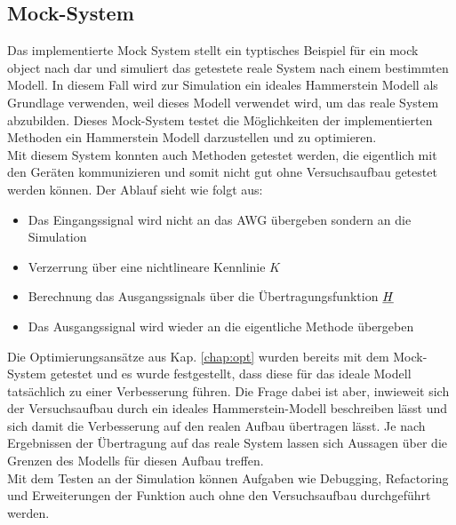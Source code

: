 \documentclass[../Report.tex]{subfiles}
\begin{document}
\subsection{Mock-System}
\label{subsec:code.mock}
Das implementierte Mock System stellt ein typtisches Beispiel für ein mock object nach \cite{mock} dar und simuliert das getestete reale System nach einem bestimmten Modell. In diesem Fall wird zur Simulation ein ideales Hammerstein Modell als Grundlage verwenden, weil dieses Modell verwendet wird, um das reale System abzubilden. Dieses Mock-System testet die Möglichkeiten der implementierten Methoden ein Hammerstein Modell darzustellen und zu optimieren.\\
Mit diesem System konnten auch Methoden getestet werden, die eigentlich mit den Geräten kommunizieren und somit nicht gut ohne Versuchsaufbau getestet werden können. Der Ablauf sieht wie folgt aus:
\begin{itemize}
	\item Das Eingangssignal wird nicht an das AWG übergeben sondern an die Simulation
	\item Verzerrung über eine nichtlineare Kennlinie $K$ 
	\item Berechnung das Ausgangssignals über die Übertragungsfunktion $\underline{H}$
	\item Das Ausgangssignal wird wieder an die eigentliche Methode übergeben
\end{itemize}
Die Optimierungsansätze aus Kap. \ref{chap:opt} wurden bereits mit dem Mock-System getestet und es wurde festgestellt, dass diese für das ideale Modell tatsächlich zu einer Verbesserung führen. Die Frage dabei ist aber, inwieweit sich der Versuchsaufbau durch ein ideales Hammerstein-Modell beschreiben lässt und sich damit die Verbesserung auf den realen Aufbau übertragen lässt. Je nach Ergebnissen der Übertragung auf das reale System lassen sich Aussagen über die Grenzen des Modells für diesen Aufbau treffen.\\
Mit dem Testen an der Simulation können Aufgaben wie Debugging, Refactoring und Erweiterungen der Funktion auch ohne den Versuchsaufbau durchgeführt werden.
\end{document}
